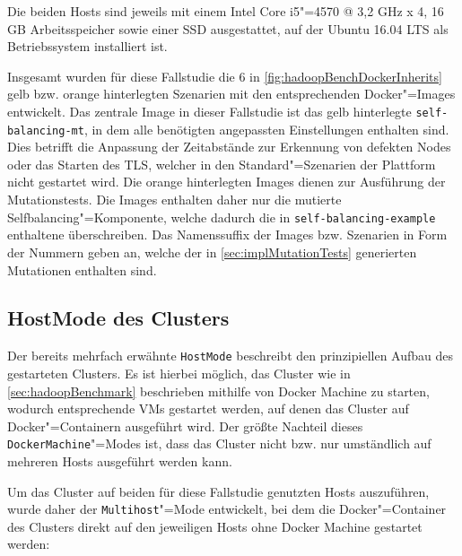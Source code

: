 Die beiden Hosts sind jeweils mit einem Intel Core i5"=4570 @ 3,2 GHz x 4, 16 GB Arbeitsspeicher sowie einer SSD ausgestattet, auf der Ubuntu 16.04 LTS als Betriebssystem installiert ist.

Insgesamt wurden für diese Fallstudie die 6 in \cref{fig:hadoopBenchDockerInherits} gelb bzw. orange hinterlegten Szenarien mit den entsprechenden Docker"=Images entwickelt.
Das zentrale Image in dieser Fallstudie ist das gelb hinterlegte \texttt{self-balancing-mt}, in dem alle benötigten angepassten Einstellungen enthalten sind.
Dies betrifft \zB die Anpassung der Zeitabstände zur Erkennung von defekten Nodes oder das Starten des \ac{TLS}, welcher in den Standard"=Szenarien der Plattform nicht gestartet wird.
Die orange hinterlegten Images dienen zur Ausführung der  Mutationstests.
Die Images enthalten daher nur die mutierte Selfbalancing"=Komponente, welche dadurch die in \texttt{self-balancing-example} enthaltene überschreiben.
Das Namenssuffix der Images bzw. Szenarien in Form der Nummern geben an, welche der in \cref{sec:implMutationTests} generierten Mutationen enthalten sind.

\subsection{HostMode des Clusters}
\label{subsec:hostMode}

Der bereits mehrfach erwähnte \texttt{HostMode} beschreibt den prinzipiellen Aufbau des gestarteten Clusters.
Es ist hierbei möglich, das Cluster wie in \cref{sec:hadoopBenchmark} beschrieben mithilfe von Docker Machine zu starten, wodurch entsprechende VMs gestartet werden, auf denen das Cluster auf Docker"=Containern ausgeführt wird.
Der größte Nachteil dieses \texttt{DockerMachine}"=Modes ist, dass das Cluster nicht bzw. nur umständlich auf mehreren Hosts ausgeführt werden kann.

Um das Cluster auf beiden für diese Fallstudie genutzten Hosts auszuführen, wurde daher der \texttt{Multihost}"=Mode entwickelt, bei dem die Docker"=Container des Clusters direkt auf den jeweiligen Hosts ohne Docker Machine gestartet werden:

